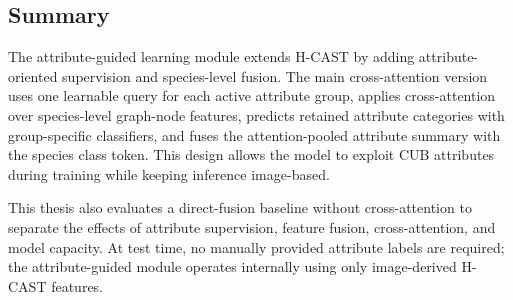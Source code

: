 \subsection{Summary}

The attribute-guided learning module extends H-CAST by adding attribute-oriented supervision and species-level fusion. The main cross-attention version uses one learnable query for each active attribute group, applies cross-attention over species-level graph-node features, predicts retained attribute categories with group-specific classifiers, and fuses the attention-pooled attribute summary with the species class token. This design allows the model to exploit CUB attributes during training while keeping inference image-based.

This thesis also evaluates a direct-fusion baseline without cross-attention to separate the effects of attribute supervision, feature fusion, cross-attention, and model capacity. At test time, no manually provided attribute labels are required; the attribute-guided module operates internally using only image-derived H-CAST features.